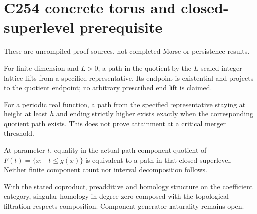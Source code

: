 \section{C254 concrete torus and closed-superlevel prerequisite}
These are uncompiled proof sources, not completed Morse or persistence results.
\begin{lemma}
\label{lem:c254-lift}
For finite dimension and $L>0$, a path in the quotient by the $L$-scaled integer
lattice lifts from a specified representative. Its endpoint is existential and
projects to the quotient endpoint; no arbitrary prescribed end lift is claimed.
\end{lemma}
\begin{lemma}
\label{lem:c254-closed}
For a periodic real function, a path from the specified representative staying
at height at least $h$ and ending strictly higher exists exactly when the
corresponding quotient path exists. This does not prove attainment at a critical
merger threshold.
\end{lemma}
\begin{lemma}
\label{lem:c254-components}
At parameter $t$, equality in the actual path-component quotient of
$F(t)=\{x:-t\le g(x)\}$ is equivalent to a path in that closed superlevel.
Neither finite component count nor interval decomposition follows.
\end{lemma}
\begin{lemma}
\label{lem:c254-h0}
With the stated coproduct, preadditive and homology structure on the coefficient
category, singular homology in degree zero composed with the topological
filtration respects composition. Component-generator naturality remains open.
\end{lemma}
